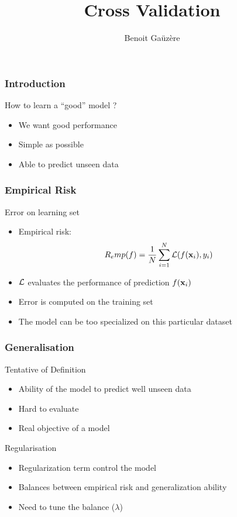 \documentclass[11pt, pdf, compress, handout]{beamer}
\title{Cross Validation}
\author{Benoit Gaüzère}
\institute{INSA Rouen Normandie - Laboratoire LITIS}
\begin{document}
\maketitle

\begin{frame}
  \frametitle{Introduction}
  \begin{block}{How to learn a ``good'' model ?}
    \begin{itemize}
    \item We want good performance 
    \item Simple as possible 
    \item Able to predict unseen data
    \end{itemize}
    
  \end{block}
\end{frame}

\begin{frame}
  \frametitle{Empirical Risk}
  \begin{block}{Error on learning set}
    \begin{itemize}
    \item Empirical risk:
      $$
      R_emp(f) = \frac{1}{N} \sum_{i=1}^N {\mathcal{L}}(f({\mathbf{x}}_i),y_i) 
      $$
      
    \item ${\mathcal{L}}$ evaluates the performance of prediction $f({\mathbf{x}}_i)$
    \item Error is computed on the training set
    \item The model can be too specialized on this particular dataset
    \end{itemize}
  \end{block}
\end{frame}

\begin{frame}
  \frametitle{Generalisation}
  \begin{block}{Tentative of Definition}

    \begin{itemize}
    \item Ability of the model to predict well unseen data
    \item Hard to evaluate 
    \item Real objective of a model
    \end{itemize}
  \end{block}
  \begin{block}{Regularisation}
    \begin{itemize}
    \item Regularization term control the model
    \item Balances between empirical risk and generalization ability
    \item Need to tune the balance ($\lambda$)
    \end{itemize}
    
  \end{block}
\end{frame}
\end{document}
